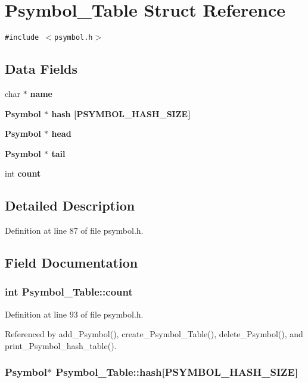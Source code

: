 \section{Psymbol\_\-Table Struct Reference}
\label{structPsymbol__Table}
{\tt \#include $<$psymbol.h$>$}

\subsection*{Data Fields}
\begin{CompactItemize}
\item 
char $\ast$ \bf{name}
\item 
\bf{Psymbol} $\ast$ \bf{hash} [PSYMBOL\_\-HASH\_\-SIZE]
\item 
\bf{Psymbol} $\ast$ \bf{head}
\item 
\bf{Psymbol} $\ast$ \bf{tail}
\item 
int \bf{count}
\end{CompactItemize}


\subsection{Detailed Description}




Definition at line 87 of file psymbol.h.

\subsection{Field Documentation}
\subsubsection{\setlength{\rightskip}{0pt plus 5cm}int \bf{Psymbol\_\-Table::count}}\label{structPsymbol__Table_59a995d4478207a9fc0c9c28c98d042b}




Definition at line 93 of file psymbol.h.

Referenced by add\_\-Psymbol(), create\_\-Psymbol\_\-Table(), delete\_\-Psymbol(), and print\_\-Psymbol\_\-hash\_\-table().
\subsubsection{\setlength{\rightskip}{0pt plus 5cm}\bf{Psymbol}$\ast$ \bf{Psymbol\_\-Table::hash}[PSYMBOL\_\-HASH\_\-SIZE]}\label{structPsymbol__Table_fccbab9ae9c434eb2f241fe0b5315352}




